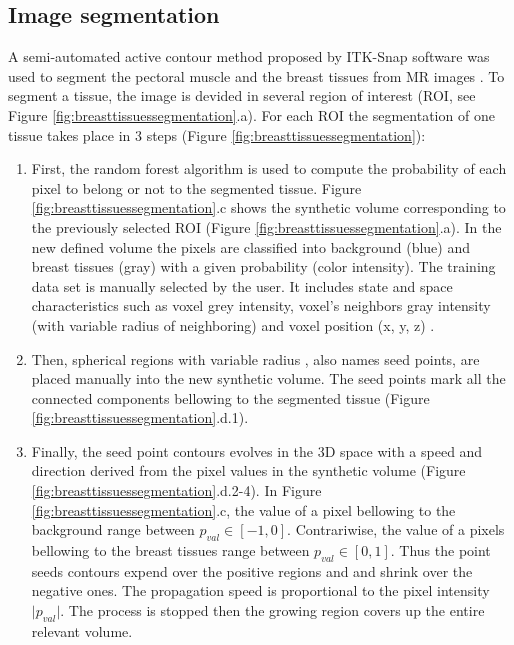 \subsection{Image segmentation}%

A semi-automated active contour method proposed by ITK-Snap software was used to segment the pectoral muscle and the breast tissues from MR images \citep{yushkevich_user_2006}. To segment a tissue, the image is devided in several region of interest (ROI, see Figure \ref{fig:breasttissuessegmentation}.a). For each ROI the segmentation of one tissue takes place in 3 steps (Figure \ref{fig:breasttissuessegmentation}):
\begin{enumerate}
\item First, the random forest algorithm \citep{ho_random_1995} is used to compute the probability of each pixel to belong or not to the segmented tissue. Figure \ref{fig:breasttissuessegmentation}.c shows the synthetic volume corresponding to the previously selected ROI (Figure \ref{fig:breasttissuessegmentation}.a). In the new defined volume the pixels are classified into background (blue) and breast tissues (gray) with a given probability (color intensity). The training data set is manually selected by the user. It includes state and space characteristics such as voxel grey intensity, voxel's neighbors gray intensity (with variable radius of neighboring) and voxel position (x, y, z) . 

\item Then, spherical regions with variable radius , also names seed points, are placed manually into the new synthetic volume. The seed points mark all the connected components bellowing to the segmented tissue (Figure \ref{fig:breasttissuessegmentation}.d.1).

\item Finally, the seed point contours evolves in the 3D space with a speed and direction derived from the pixel values in the synthetic volume (Figure \ref{fig:breasttissuessegmentation}.d.2-4). In Figure \ref{fig:breasttissuessegmentation}.c, the value of a pixel bellowing to the background range between $p_{val} \in [-1,0]$. Contrariwise, the value of a pixels bellowing to the breast tissues range between $p_{val} \in [0,1]$. Thus the point seeds contours expend over the positive regions and and shrink over the negative ones. The propagation speed is proportional to the pixel intensity $\vert p_{val} \vert$. The process is stopped then the growing region covers up the entire relevant volume.  
\end{enumerate}

